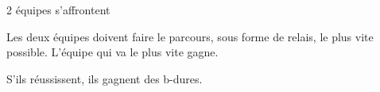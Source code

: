 \documentclass{grand-jeu}
\begin{document}
\begin{liste-materiel}
\end{liste-materiel}

\begin{regles}
2 équipes s'affrontent

Les deux équipes doivent faire le parcours, sous forme de relais, le plus vite possible. L’équipe qui va le plus vite gagne.

S’ils réussissent, ils gagnent des b-dures.
\end{regles}

\begin{imaginaire}

\end{imaginaire}

\begin{moments-stop}
\end{moments-stop}
\end{document}
